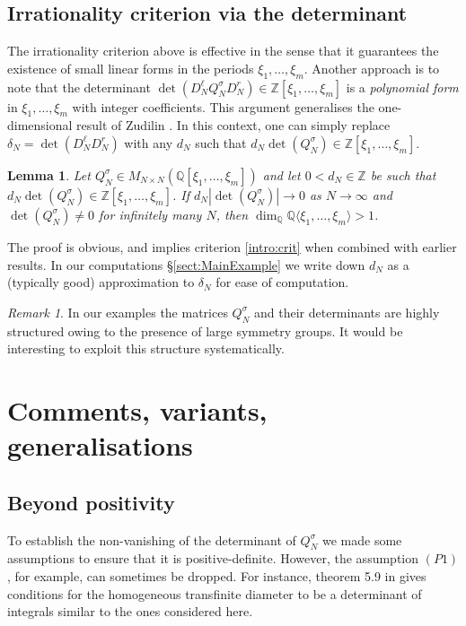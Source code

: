 \documentclass[a4paper,10pt]{amsart}
\newtheorem{lem}[thm]{Lemma}
\theoremstyle{definition}
\theoremstyle{remark}
\newtheorem{rem}[thm]{Remark}
\numberwithin{equation}{section}
\newcommand{\Z}{\mathbb Z}
\newcommand{\Q}{\mathbb Q}
\newcommand{\0}{\color{blue}{\mathsf{0}}}
\begin{document}
  \subsection{Irrationality criterion via the determinant}
  The irrationality  criterion above is effective in the sense that it guarantees the existence of small linear forms in the periods $\xi_1,\ldots, \xi_m$. 
  Another approach is to note that the  determinant  $\det( D^{\ell}_N Q_N^{\sigma} D_N^r) \in \Z[\xi_1,\ldots, \xi_m]$ is a \emph{polynomial form} in $\xi_1,\ldots, \xi_m$  with integer coefficients. 
  This argument generalises the one-dimensional result of Zudilin \cite{ZudilinDet}. In this context, one can  simply replace $\delta_N=  \det( D^{\ell}_N D_N^r)$ with any $d_N$ such that  $d_N \det(Q_N^{\sigma}) \in \Z[\xi_1,\ldots, \xi_m]$.
  
  \begin{lem} Let $Q^{\sigma}_N \in M_{N\times N}(\Q[\xi_1,\ldots, \xi_m])$ and let $0<d_N  \in \Z$ be such that  $d_N \det(Q_N^{\sigma}) \in \Z[\xi_1,\ldots, \xi_m]$.
If $d_N |\det(Q_N^{\sigma})|\rightarrow 0$ as $N\rightarrow \infty$ and $\det(Q_N^{\sigma}) \neq 0$ for infinitely many $N$, then 
 $\dim_{\Q} \Q\langle \xi_1,\ldots, \xi_m\rangle >1$.
  \end{lem} 
  
  The proof is obvious, and implies criterion \ref{intro:crit} when combined with earlier results.  In our computations \S\ref{sect:MainExample} we write down $d_N$ as a (typically  good)  approximation to  $\delta_N$  for ease of computation. 
    
  
  \begin{rem} In our examples the matrices $Q^{\sigma}_N$  and their determinants are  highly structured  owing to the presence  of large symmetry groups. It would be interesting to exploit this structure systematically. 
  \end{rem} 
   
 
 \section{Comments, variants, generalisations} \label{sect: Comments}
 
 \subsection{Beyond positivity}  To establish the non-vanishing of the determinant of $Q_N^{\sigma}$ we made some assumptions  to ensure that it is positive-definite. However, the assumption $(P1)$, for example,  can sometimes be dropped. 
  For instance, theorem 5.9  in \cite{LimitsTransfinite} gives conditions for the homogeneous transfinite diameter to be a determinant of integrals similar to the ones considered here. 
 
\end{document}
